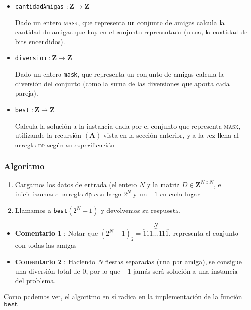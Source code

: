 \begin{itemize}
	\item \texttt{cantidadAmigas} $ : \mathbf{Z} \rightarrow \mathbf{Z}$
	
	Dado un entero \textsc{mask}, que representa un conjunto de amigas calcula la cantidad de amigas que hay en el conjunto representado (o sea, la cantidad de bits encendidos).

	\item \texttt{diversion} $ : \mathbf{Z} \rightarrow \mathbf{Z}$
	
	Dado un entero \texttt{mask}, que representa un conjunto de amigas calcula la diversión del conjunto (como la suma de las diversiones que aporta cada pareja).
	
	\item \texttt{best} $ : \mathbf{Z} \rightarrow \mathbf{Z}$
	
	Calcula la solución a la instancia dada por el conjunto que representa \textsc{mask}, utilizando la recursión $(\mathbf{A})$ vista en la sección anterior, y a la vez llena al arreglo \textsc{dp} según su especificación.
\end{itemize}

\subsubsection{Algoritmo}

\begin{enumerate}
	\item Cargamos los datos de entrada (el entero $N$ y la matriz $D \in \mathbf{Z}^{N \times N}$, e inicializamos el arreglo \texttt{dp} con largo $2^N$ y un $-1$ en cada lugar.
	\item Llamamos a \texttt{best}$(2^N - 1)$ y devolvemos su respuesta. 
\end{enumerate}

\begin{itemize}
	\item \textbf{Comentario 1} : Notar que $(2^N-1)_2 = \overset{N}{\overbrace{111\dots111}}$, representa el conjunto con todas las amigas
	\item \textbf{Comentario 2} : Haciendo $N$ fiestas separadas (una por amiga), se consigue una diversión total de $0$, por lo que $-1$ jamás será solución a una instancia del problema.
\end{itemize}

 
 Como podemos ver, el algoritmo en sí radica en la implementación de la función $\texttt{best}$

